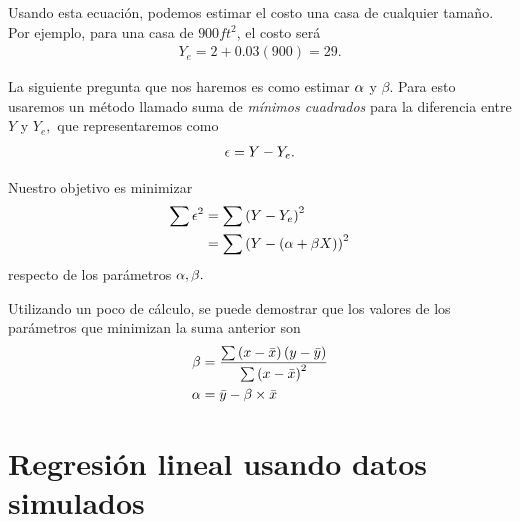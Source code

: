 Usando esta ecuación, podemos estimar el costo una casa de cualquier tamaño.  Por ejemplo, para una casa de $900 ft^{2}$, el costo será
\begin{align}
 Y_{e}= 2 + 0.03(900)= 29 .
\end{align}


La siguiente pregunta que nos haremos es como estimar $\alpha$ y $\beta.$  Para esto usaremos un método llamado suma de  \emph{mínimos cuadrados} para la diferencia entre $Y$ y $Y_{e},$ que representaremos como
\begin{align}
 \epsilon = Y-Y_{e}.
\end{align}

 

Nuestro objetivo es minimizar
 \begin{align}
  \sum \epsilon^{2} & = \sum \left( Y-Y_{e} \right)^{2}\\
  &= \sum \left( Y - \left( \alpha+\beta X \right) \right)^{2}
 \end{align}
respecto de los parámetros $\alpha, \beta.$


Utilizando un poco de cálculo, se puede demostrar que los valores de los parámetros que minimizan la suma anterior son
\begin{align}
\label{beta}
\beta &= \dfrac{\sum \left( x-\bar{x} \right)\left( y-\bar{y} \right)}{\sum\left( x-\bar{x} \right)^{2}}\\
\label{alfa}
\alpha &= \bar{y}-\beta\times \bar{x}
\end{align}

% 
% 
\section{Regresión lineal usando datos simulados}

